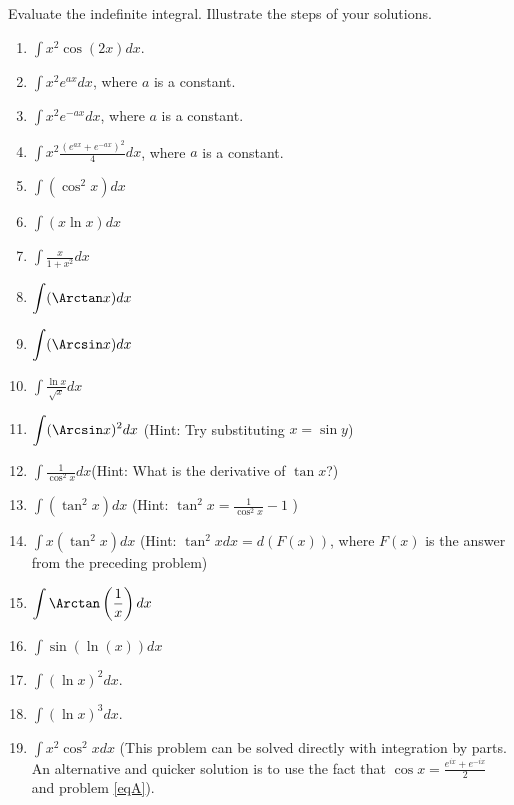 Evaluate the indefinite integral. Illustrate the steps of your solutions.
\begin{multicols}{2}
\begin{enumerate}
\item $\displaystyle\int x^2\cos (2x) dx$.
\item 
$\displaystyle\int x^2e^{ax} dx$, where $a$ is a constant.
\item 
$\displaystyle\int x^2e^{-ax}dx$, where $a$ is a constant.
\item \label{eqA}
$\displaystyle\int x^2\frac{(e^{ax}+e^{-ax})^2}4dx$, where $a$ is a constant. 
\item 
$\displaystyle\int (\cos^2x) dx$ 
\item 
$\displaystyle \int (x\ln x )dx $
\item $\displaystyle\int \frac{x}{1+x^2} dx$ 
\item 
$\displaystyle \int (\Arctan x) dx$
\item 
$\displaystyle \int (\Arcsin x) dx
$
\item $\displaystyle\int \frac{\ln x}{\sqrt{x}}dx $
\item $\displaystyle\int (\Arcsin x)^2 dx $ \quad \quad (Hint: Try substituting $x=\sin y$)
\item $\displaystyle\int \frac{1}{\cos^2 x}dx$\quad \quad (Hint: What is the derivative of $\tan x$?)
\item $\displaystyle\int (\tan^2 x) dx $ \quad \quad (Hint: $\tan^2 x = \frac{1}{\cos^2x }-1$ )
\item $\displaystyle\int x(\tan^2 x) dx $ \quad \quad (Hint: $\tan^2 x dx= d(F(x))$, where $F(x)$ is the answer from the preceding problem)
\item 
$\displaystyle
\int\Arctan \left(\frac{1}x\right)dx
$
\item $\displaystyle\int \sin (\ln (x)) dx $
\item $\displaystyle\int (\ln x)^2 dx$.
\item $\displaystyle\int (\ln x)^3 dx$.
\item $\displaystyle\int x^2\cos^2x dx$ (This problem can be solved directly with integration by parts. An alternative and quicker solution is to use the fact that $\cos x= \frac{ e^{ix} + e^{-ix}}{2}$ and problem \ref{eqA}).
\end{enumerate}
\end{multicols}